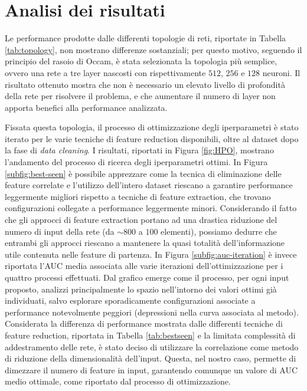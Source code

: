 \section{Analisi dei risultati}
Le performance prodotte dalle differenti topologie di reti, riportate in Tabella \ref{tab:topology}, non mostrano differenze sostanziali; per questo motivo, seguendo il principio del rasoio di Occam, è stata selezionata la topologia più semplice, ovvero una rete a tre layer nascosti con rispettivamente $512$, $256$ e $128$ neuroni. 
Il risultato ottenuto mostra che non è necessario un elevato livello di profondità della rete per risolvere il problema, e che aumentare il numero di layer non apporta benefici alla performance analizzata.

Fissata questa topologia, il processo di ottimizzazione degli iperparametri è stato iterato per le varie tecniche di feature reduction disponibili, oltre al dataset dopo la fase di \textit{data cleaning}. 
I risultati, riportati in Figura \ref{fig:HPO}, mostrano l'andamento del processo di ricerca degli iperparametri ottimi. 
In Figura \ref{subfig:best-seen} è possibile apprezzare come la tecnica di eliminazione delle feature correlate e l'utilizzo dell'intero dataset riescano a garantire performance leggermente migliori rispetto a tecniche di feature extraction, che trovano configurazioni collegate a performance leggermente minori. 
Considerando il fatto che gli approcci di feature extraction portano ad una drastica riduzione del numero di input della rete (da $\sim800$ a $100$ elementi), possiamo dedurre che entrambi gli approcci riescano a mantenere la quasi totalità dell'informazione utile contenuta nelle feature di partenza. 
In Figura \ref{subfig:auc-iteration} è invece riportata l'AUC media associata alle varie iterazioni dell'ottimizzazione per i quattro processi effettuati. 
Dal grafico emerge come il processo, per ogni input proposto, analizzi principalmente lo spazio nell'intorno dei valori ottimi già individuati, salvo esplorare sporadicamente configurazioni associate a performance notevolmente peggiori (depressioni nella curva associata al metodo).\\
Considerata la differenza di performance mostrata dalle differenti tecniche di feature reduction, riportata in Tabella \ref{tab:bestseen} e la limitata complessità di addestramento delle rete, è stato deciso di utilizzare la correlazione come metodo di riduzione della dimensionalità dell'input. 
Questa, nel nostro caso, permette di dimezzare il numero di feature in input, garantendo comunque un valore di AUC medio ottimale, come riportato dal processo di ottimizzazione. 

